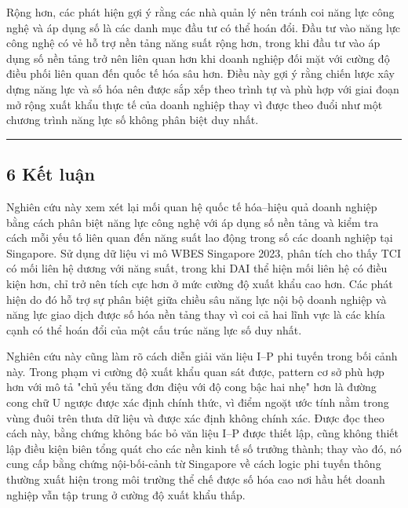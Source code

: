 \documentclass[12pt,a4paper]{article}
\begin{document}
Rộng hơn, các phát hiện gợi ý rằng các nhà quản lý nên tránh coi năng
lực công nghệ và áp dụng số là các danh mục đầu tư có thể hoán đổi. Đầu
tư vào năng lực công nghệ có vẻ hỗ trợ nền tảng năng suất rộng hơn,
trong khi đầu tư vào áp dụng số nền tảng trở nên liên quan hơn khi doanh
nghiệp đối mặt với cường độ điều phối liên quan đến quốc tế hóa sâu hơn.
Điều này gợi ý rằng chiến lược xây dựng năng lực và số hóa nên được sắp
xếp theo trình tự và phù hợp với giai đoạn mở rộng xuất khẩu thực tế của
doanh nghiệp thay vì được theo đuổi như một chương trình năng lực số
không phân biệt duy nhất.

\begin{center}\rule{0.5\linewidth}{0.5pt}\end{center}

\hypertarget{6-kux1ebft-luux1eadn}{%
\subsection{6 Kết luận}\label{6-kux1ebft-luux1eadn}}

Nghiên cứu này xem xét lại mối quan hệ quốc tế hóa--hiệu quả doanh
nghiệp bằng cách phân biệt năng lực công nghệ với áp dụng số nền tảng và
kiểm tra cách mỗi yếu tố liên quan đến năng suất lao động trong số các
doanh nghiệp tại Singapore. Sử dụng dữ liệu vi mô WBES Singapore 2023,
phân tích cho thấy TCI có mối liên hệ dương với năng suất, trong khi DAI
thể hiện mối liên hệ có điều kiện hơn, chỉ trở nên tích cực hơn ở mức
cường độ xuất khẩu cao hơn. Các phát hiện do đó hỗ trợ sự phân biệt giữa
chiều sâu năng lực nội bộ doanh nghiệp và năng lực giao dịch được số hóa
nền tảng thay vì coi cả hai lĩnh vực là các khía cạnh có thể hoán đổi
của một cấu trúc năng lực số duy nhất.

Nghiên cứu này cũng làm rõ cách diễn giải văn liệu I--P phi tuyến trong
bối cảnh này. Trong phạm vi cường độ xuất khẩu quan sát được, pattern cơ
sở phù hợp hơn với mô tả "chủ yếu tăng đơn điệu với độ cong bậc hai nhẹ"
hơn là đường cong chữ U ngược được xác định chính thức, vì điểm ngoặt
ước tính nằm trong vùng đuôi trên thưa dữ liệu và được xác định không
chính xác. Được đọc theo cách này, bằng chứng không bác bỏ văn liệu I--P
được thiết lập, cũng không thiết lập điều kiện biên tổng quát cho các
nền kinh tế số trưởng thành; thay vào đó, nó cung cấp bằng chứng
nội-bối-cảnh từ Singapore về cách logic phi tuyến thông thường xuất hiện
trong môi trường thể chế được số hóa cao nơi hầu hết doanh nghiệp vẫn
tập trung ở cường độ xuất khẩu thấp.
\end{document}
